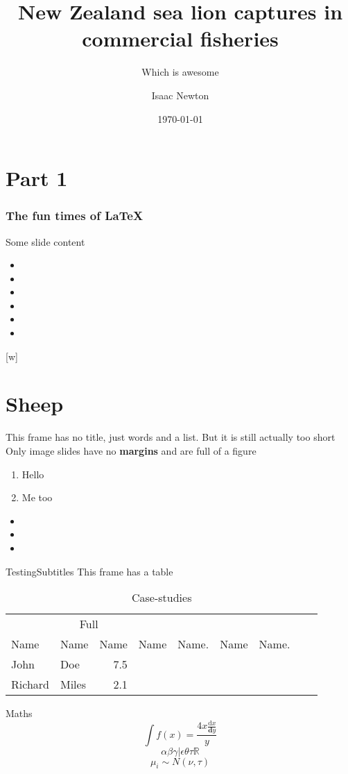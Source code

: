 \documentclass[xcolor={table}]{beamer}
\title{New Zealand sea lion captures in commercial fisheries}
\subtitle{Which is awesome}
\author{Isaac Newton}
\date{\today}
\begin{document}
\titleslide

\section{Part 1}

\begin{frame}
  \frametitle{The fun times of \LaTeX}
  Some slide content
\begin{itemize}
  \item \the\topmargin
  \item \the\headheight
  \item \the\headsep
  \item \the\textheight
  \item \the\footskip
  \item \the\paperheight
\end{itemize}
\end{frame}

[w]%

\section{Sheep}

\begin{frame}{This frame has no title, just words and a list. But it is still actually
  too short}
  Only image slides have no \textbf{margins} and are full of a figure


\begin{enumerate}
  \item Hello
  \item Me too
\end{enumerate}
\begin{itemize}
  \item \the\paperheight
  \item \the\footskip
  \item \the\textheight
\end{itemize}
 \end{frame}

 \begin{frame}{Testing}{Subtitles}
This frame has a table

\begin{table}[htbp]
\caption{Case-studies}
\centering
\begin{tabular}{llrllllll}
\toprule
\multicolumn{4}{c}{Full}  \\

\cmidrule(r){4-5}
\cmidrule(r){6-7}

Name & Name & Name & Name & Name. & Name & Name.  \\
\midrule
John & Doe & 7.5 \\
Richard & Miles & 2.1\\
\bottomrule
\end{tabular}
\label{case-studies}
\end{table}


 \end{frame}


 \begin{frame}{Maths}
$$
\int f(x) = \frac{4x \frac{\mathrm{d}x}{\textbf{d}y}}{y} 
$$
$$
\alpha\beta\gamma|\epsilon\theta\tau \mathbb{R}
$$
$$
\mu_i \sim  N \left(\nu,\tau\right)
$$
 \end{frame}
\end{document}
